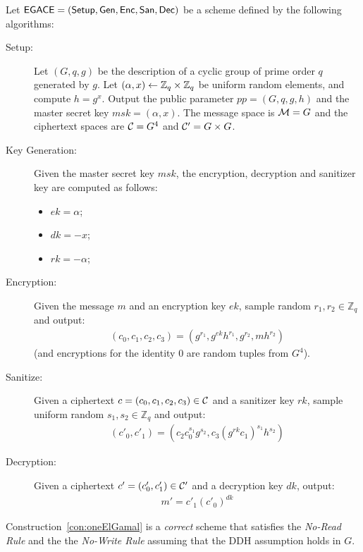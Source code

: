 \documentclass{llncs}
\begin{document}
\begin{construction} \label{con:oneElGamal}
Let $\mathsf{EGACE} = (\mathsf{Setup}, \mathsf{Gen}, \mathsf{Enc}, \mathsf{San}, \mathsf{Dec})$ be a \oACE scheme defined by the following algorithms:
\end{construction}
\begin{description}
\item[Setup:] Let $(G,q,g)$ be the description of a cyclic group of prime order $q$ generated by $g$. Let $(\alpha, x) \leftarrow \mathbb{Z}_q\times \mathbb{Z}_q$ be uniform random elements, and compute $h=g^x$. Output the public parameter  $pp = (G,q,g,h)$ and the master secret key $msk = (\alpha,x)$. The message space is $\mathcal{M}=G$ and the ciphertext spaces are $\mathcal{C} = G^4$ and $\mathcal{C}' = G \times G$.

\item[Key Generation:] Given the master secret key $msk$, the encryption, decryption and sanitizer key are computed as follows:
	\begin{itemize}
	\item $ek = \alpha$;
	\item $dk = - x$;
	\item $rk = -\alpha$;
	\end{itemize}

\item[Encryption:] Given the message $m$ and an encryption key $ek$, sample random $r_1,r_2 \in \mathbb{Z}_q$ and output:
\begin{align*}
	(c_0, c_1, c_2, c_3) = (g^{r_1}, g^{ek} h^{r_1}, g^{r_2}, mh^{r_2})
\end{align*}
(and encryptions for the identity $0$ are random tuples from $G^4$).

\item[Sanitize:] Given a ciphertext $c = (c_0, c_1, c_2, c_3) \in \mathcal{C}$ and a sanitizer key $rk$, sample uniform random $s_1,s_2 \in \mathbb{Z}_q$ and output:
\begin{align*}
	(c'_0, c'_1 )= (c_2c_0^{s_1}g^{s_2},c_3 (g^{rk} c_1)^{s_1} h^{s_2})
\end{align*}

\item[Decryption:] Given a ciphertext $c' = (c'_0, c'_1) \in \mathcal{C}'$ and a decryption key $dk$, output:
\begin{align*}
	m' = c'_1(c'_0)^{dk}
\end{align*}
\end{description}




\begin{lem}\label{lem:elgamal}
Construction~\ref{con:oneElGamal} is a \emph{correct} \oACE scheme that satisfies the \emph{No-Read Rule} and the the \emph{No-Write Rule} assuming that the DDH assumption holds in $G$.
\end{lem}
\end{document}

